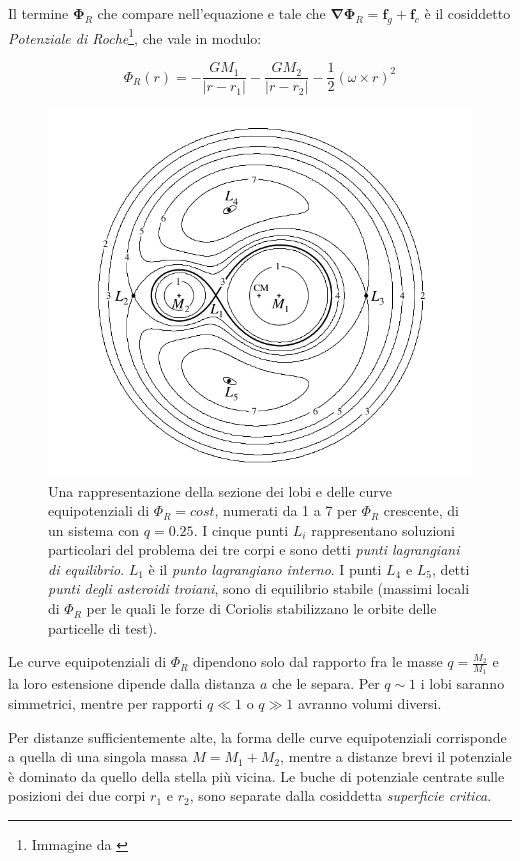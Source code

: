 \documentclass[a4paperbi]{article}
\begin{document}
	Il termine $\bm{\Phi}_R$ che compare nell'equazione e tale che $\bm{\nabla}\bm{\Phi}_R=\bm{f}_g+\bm{f}_c$ è il cosiddetto \textit{Potenziale di Roche}\footnote{Immagine da \cite{FrankKingRaineAccretionPower}}, che vale in modulo:

	\begin{equation}
		\Phi_R(\textit{r})=-\frac{GM_1}{\vert\textit{r}-\textit{r}_1\vert}-\frac{GM_2}{\vert\textit{r}-\textit{r}_2\vert}-\frac{1}{2}(\omega\times\textit{r})^2
	\end{equation}
	
	\begin{figure}[H]
		\centering
		\includegraphics[width=0.7\linewidth]{RocheEquipotential}
		\caption{Una rappresentazione della sezione dei lobi e delle curve equipotenziali di $\Phi_R=cost$, numerati da 1 a 7 per $\Phi_R$ crescente, di un sistema con $q=0.25$. I cinque punti $L_i$ rappresentano soluzioni particolari del problema dei tre corpi e sono detti \textit{punti lagrangiani di equilibrio}. $L_1$ è il \textit{punto lagrangiano interno}. I punti $L_4$ e $L_5$, detti \textit{punti degli asteroidi troiani}, sono di equilibrio stabile (massimi locali di $\Phi_R$ per le quali le forze di Coriolis stabilizzano le orbite delle particelle di test).}
		\label{fig:rocheequipotential}
	\end{figure}

	Le curve equipotenziali di $\Phi_R$ dipendono solo dal rapporto fra le masse $q=\frac{M_2}{M_1}$ e la loro estensione dipende dalla distanza $a$ che le separa. Per $q\sim1$ i lobi saranno simmetrici, mentre per rapporti $q\ll1$ o $q\gg1$ avranno volumi diversi.

	Per distanze sufficientemente alte, la forma delle curve equipotenziali corrisponde a quella di una singola massa $M=M_1+M_2$, mentre a distanze brevi il potenziale è dominato da quello della stella più vicina. Le buche di potenziale centrate sulle posizioni dei due corpi $\textit{r}_1$ e $\textit{r}_2$, sono separate dalla cosiddetta \textit{superficie critica}.
	
\end{document}
